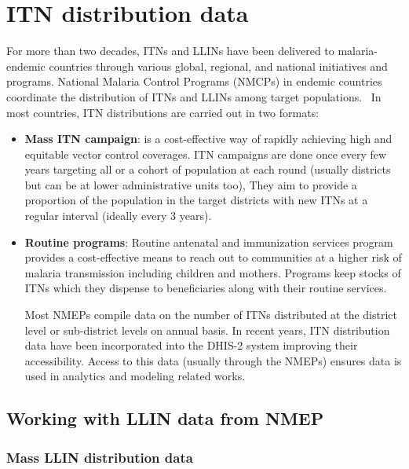\documentclass[
  letterpaper,
  DIV=11,
  numbers=noendperiod]{scrreprt}
\begin{document}

\hypertarget{itn-distribution-data}{%
\chapter{\texorpdfstring{\textbf{ITN distribution
data}}{ITN distribution data}}\label{itn-distribution-data}}

For more than two decades, ITNs and LLINs have been delivered to
malaria-endemic countries through various global, regional, and national
initiatives and programs. National Malaria Control Programs (NMCPs) in
endemic countries coordinate the distribution of ITNs and LLINs among
target populations.~ In most countries, ITN distributions are carried
out in two formats:

\begin{itemize}
\item
  \textbf{Mass ITN campaign}: is a cost-effective way of rapidly
  achieving high and equitable vector control coverages. ITN campaigns
  are done once every few years targeting all or a cohort of population
  at each round (usually districts but can be at lower administrative
  units too), They aim to provide a proportion of the population in the
  target districts with new ITNs at a regular interval (ideally every 3
  years).
\item
  \textbf{Routine programs}: Routine antenatal and immunization services
  program provides a cost-effective means to reach out to communities at
  a higher risk of malaria transmission including children and mothers.
  Programs keep stocks of ITNs which they dispense to beneficiaries
  along with their routine services.

  Most NMEPs compile data on the number of ITNs distributed at the
  district level or sub-district levels on annual basis. In recent
  years, ITN distribution data have been incorporated into the DHIS-2
  system improving their accessibility. Access to this data (usually
  through the NMEPs) ensures data is used in analytics and modeling
  related works.
\end{itemize}

\hypertarget{working-with-llin-data-from-nmep}{%
\section{Working with LLIN data from
NMEP}\label{working-with-llin-data-from-nmep}}

\hypertarget{mass-llin-distribution-data}{%
\subsection{\texorpdfstring{\textbf{Mass LLIN distribution
data}}{Mass LLIN distribution data}}\label{mass-llin-distribution-data}}
\end{document}
